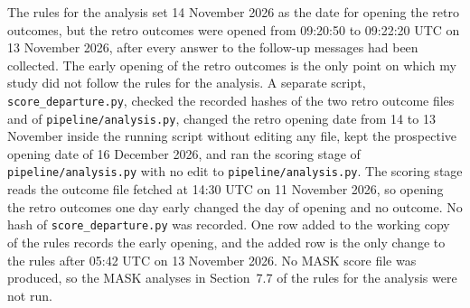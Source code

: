 \documentclass[11pt]{article}
\begin{document}
The rules for the analysis set 14 November 2026 as the date for opening the retro outcomes, but the retro outcomes were opened from 09:20:50 to 09:22:20 UTC on 13 November 2026, after every answer to the follow-up messages had been collected. The early opening of the retro outcomes is the only point on which my study did not follow the rules for the analysis. A separate script, \texttt{score\_departure.py}, checked the recorded hashes of the two retro outcome files and of \texttt{pipeline/analysis.py}, changed the retro opening date from 14 to 13 November inside the running script without editing any file, kept the prospective opening date of 16 December 2026, and ran the scoring stage of \texttt{pipeline/analysis.py} with no edit to \texttt{pipeline/analysis.py}. The scoring stage reads the outcome file fetched at 14:30 UTC on 11 November 2026, so opening the retro outcomes one day early changed the day of opening and no outcome. No hash of \texttt{score\_departure.py} was recorded. One row added to the working copy of the rules records the early opening, and the added row is the only change to the rules after 05:42 UTC on 13 November 2026. No MASK score file was produced, so the MASK analyses in Section~7.7 of the rules for the analysis were not run.
\end{document}
